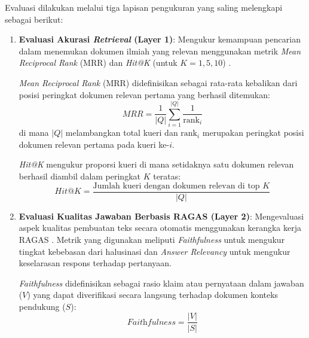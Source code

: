 \begin{enumerate}[label=\textbf{\arabic*.}, leftmargin=*, itemsep=10pt]
          \hspace*{0.75cm}Evaluasi dilakukan melalui tiga lapisan pengukuran yang saling melengkapi sebagai berikut:

          \begin{enumerate}[label=\arabic*., leftmargin=0.75cm, itemsep=4pt]

              \item \textbf{Evaluasi Akurasi \textit{Retrieval} (Layer 1)}:
                    Mengukur kemampuan pencarian dalam menemukan dokumen ilmiah yang relevan menggunakan metrik \textit{Mean Reciprocal Rank} (MRR) dan \textit{Hit@K} (untuk $K = 1, 5, 10$) \citep{manning2008introduction}.

                    \textit{Mean Reciprocal Rank} (MRR) didefinisikan sebagai rata-rata kebalikan dari posisi peringkat dokumen relevan pertama yang berhasil ditemukan:
                    \begin{equation}
                        \textit{MRR} = \frac{1}{|Q|} \sum_{i=1}^{|Q|} \frac{1}{\text{rank}_i}
                    \end{equation}
                    di mana $|Q|$ melambangkan total kueri dan $\text{rank}_i$ merupakan peringkat posisi dokumen relevan pertama pada kueri ke-$i$.

                    \textit{Hit@K} mengukur proporsi kueri di mana setidaknya satu dokumen relevan berhasil diambil dalam peringkat $K$ teratas:
                    \begin{equation}
                        \textit{Hit@K} = \frac{\text{Jumlah kueri dengan dokumen relevan di top } K}{|Q|}
                    \end{equation}

              \item \textbf{Evaluasi Kualitas Jawaban Berbasis RAGAS (Layer 2)}:
                    Mengevaluasi aspek kualitas pembuatan teks secara otomatis menggunakan kerangka kerja RAGAS \citep{es-etal-2024-ragas}. Metrik yang digunakan meliputi \textit{Faithfulness} untuk mengukur tingkat kebebasan dari halusinasi dan \textit{Answer Relevancy} untuk mengukur keselarasan respons terhadap pertanyaan.

                    \textit{Faithfulness} didefinisikan sebagai rasio klaim atau pernyataan dalam jawaban ($V$) yang dapat diverifikasi secara langsung terhadap dokumen konteks pendukung ($S$):
                    \begin{equation}
                        \textit{Faithfulness} = \frac{|V|}{|S|}
                    \end{equation}


\end{enumerate}
\end{enumerate}
